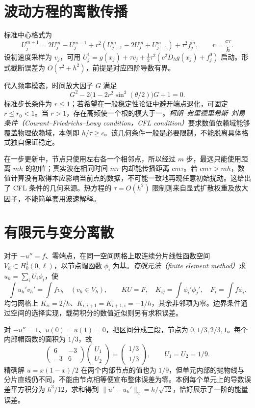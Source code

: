 \section{波动方程的离散传播}
标准中心格式为
\[
 U_j^{m+1}=2U_j^m-U_j^{m-1}+
 r^2(U_{j+1}^m-2U_j^m+U_{j-1}^m)+\tau^2 f_j^m,
 \qquad r=\frac{c\tau}{h}.
\]
设初速度采样为 $v_j$，可用 $U_j^1=g(x_j)+\tau v_j+\frac12\tau^2(c^2D_hg(x_j)+f_j^0)$ 启动。形式截断误差为 $O(\tau^2+h^2)$，前提是对应四阶导数有界。

代入频率模态，时间放大因子 $G$ 满足
\[
 G^2-2\bigl(1-2r^2\sin^2(\theta/2)\bigr)G+1=0.
\]
标准步长条件为 $r\le1$；若希望在一般稳定性论证中避开端点退化，可固定 $r\le r_0<1$。当 $r>1$，存在高频使一个根的模大于一。\emph{柯朗--弗里德里希斯--刘易条件（Courant--Friedrichs--Lewy condition，CFL condition）}要求数值依赖域能够覆盖物理依赖域，本例即 $h/\tau\ge c$。该几何条件一般是必要限制，不能脱离具体格式独自保证稳定。

在一步更新中，节点只使用左右各一个相邻点，所以经过 $m$ 步，最远只能使用距离 $mh$ 的初值；真实波在相同时间 $m\tau$ 内却能传播距离 $cm\tau$。若 $cm\tau>mh$，数值计算没有取得本应影响当前点的数据，不可能一致地再现任意初始扰动。这给出了 CFL 条件的几何来源。热方程的 $\tau=O(h^2)$ 限制则来自显式扩散权重及放大因子，不能简单套用波速解释。

\section{有限元与变分离散}
对于 $-u''=f$、零端点，在同一空间网格上取连续分片线性函数空间 $V_h\subset H_0^1(0,\ell)$，以节点帽函数 $\phi_i$ 为基。\emph{有限元法（finite element method）}求 $u_h=\sum_iU_i\phi_i$，使
\[
 \int u_h'v_h'=\int fv_h\quad(v_h\in V_h),\qquad
 KU=F,\quad K_{ij}=\int\phi_i'\phi_j',\quad F_i=\int f\phi_i.
\]
均匀网格上 $K_{ii}=2/h$、$K_{i,i+1}=K_{i+1,i}=-1/h$，其余非邻项为零。边界条件通过空间的选择实现，载荷积分的数值近似则另有求积误差。

\begin{example}[两项未知量的有限元方程]
对 $-u''=1$、$u(0)=u(1)=0$，把区间分成三段，节点为 $0,1/3,2/3,1$。每个内部帽函数的面积为 $1/3$，故
\[
 \begin{pmatrix}6&-3\\-3&6\end{pmatrix}
 \begin{pmatrix}U_1\\U_2\end{pmatrix}
 =\begin{pmatrix}1/3\\1/3\end{pmatrix},
 \qquad U_1=U_2=1/9.
\]
精确解 $u=x(1-x)/2$ 在两个内部节点的值也为 $1/9$，但单元内部的抛物线与分片直线仍不同，不能由节点相等便宣布整体误差为零。本例每个单元上的导数误差平方积分为 $h^3/12$，求和得到 $\|u'-u_h'\|_2=h/\sqrt{12}$，恰好展示了一阶的能量误差。
\end{example}

